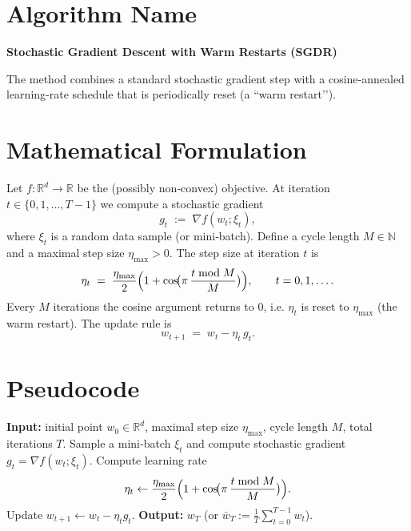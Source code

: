\documentclass{article}
\newcommand{\R}{\mathbb{R}}
\begin{document}
\section*{Algorithm Name}
\textbf{Stochastic Gradient Descent with Warm Restarts (SGDR)}  

The method combines a standard stochastic gradient step with a cosine‐annealed learning‑rate schedule that is periodically reset (a ``warm restart’’).

\section*{Mathematical Formulation}
Let $f:\R^{d}\rightarrow\R$ be the (possibly non‑convex) objective.  
At iteration $t\in\{0,1,\dots,T-1\}$ we compute a stochastic gradient
\[
g_t \;:=\; \nabla f(w_t; \xi_t),
\]
where $\xi_t$ is a random data sample (or mini‑batch).  
Define a cycle length $M\in\mathbb{N}$ and a maximal step size $\eta_{\max}>0$.  
The step size at iteration $t$ is
\begin{equation}
\label{eq:eta}
\eta_t \;=\; \frac{\eta_{\max}}{2}\Bigl(1+\cos\!\bigl(\pi\,\frac{t\bmod M}{M}\bigr)\Bigr),\qquad t=0,1,\dots .
\end{equation}
Every $M$ iterations the cosine argument returns to $0$, i.e. $\eta_t$ is reset to $\eta_{\max}$ (the warm restart).  
The update rule is
\begin{equation}
\label{eq:update}
w_{t+1}\;=\;w_t-\eta_t\,g_t .
\end{equation}

\section*{Pseudocode}
\begin{algorithm}[H]
\caption{SGDR}
\begin{algorithmic}[1]
\STATE \textbf{Input:} initial point $w_0\in\R^d$, maximal step size $\eta_{\max}$, cycle length $M$, total iterations $T$.
    \STATE Sample a mini‑batch $\xi_t$ and compute stochastic gradient $g_t=\nabla f(w_t;\xi_t)$.
    \STATE Compute learning rate
    \[
    \eta_t\gets \frac{\eta_{\max}}{2}\Bigl(1+\cos\!\bigl(\pi\,\frac{t\bmod M}{M}\bigr)\Bigr).
    \]
    \STATE Update $w_{t+1}\gets w_t-\eta_t g_t$.
\ENDFOR
\STATE \textbf{Output:} $w_T$ (or $\bar w_T:=\frac1T\sum_{t=0}^{T-1}w_t$).
\end{algorithmic}
\end{algorithm}
\end{document}
